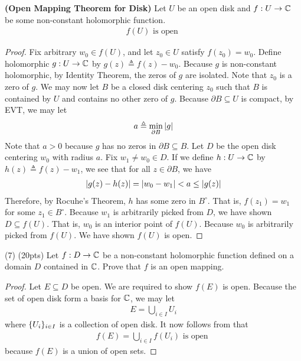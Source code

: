 \documentclass{report}
\begin{document}
\begin{theorem}
\label{OMT}
\textbf{(Open Mapping Theorem for Disk)} Let $U$ be an open disk and  $f:U \rightarrow \mathbb{C}$ be some non-constant holomorphic function. 
\begin{align*}
f(U)\text{ is open }
\end{align*}
\end{theorem}
\begin{proof}
Fix arbitrary $w_0\in f(U)$, and let $z_0\in U$ satisfy $f(z_0)=w_0$. Define holomorphic $g:U\rightarrow \mathbb{C}$ by $g(z)\triangleq f(z)-w_0$. Because $g$ is non-constant holomorphic, by Identity Theorem, the zeros of $g$ are isolated. Note that $z_0$ is a zero of  $g$. We may now let  $B$ be a closed disk centering  $z_0$ such that  $B$ is contained by $U$ and contains no other zero of  $g$. Because $\partial B\subseteq U$ is compact, by EVT, we may let 
\begin{align*}
a\triangleq \min_{\partial B}\left|g\right|
\end{align*}
Note that $a>0$ because  $g$ has no zeros in  $\partial B \subseteq B$. Let $D$ be the open disk centering  $w_0$ with radius  $a$. Fix $w_1 \neq w_0\in D$. If we define $h:U\rightarrow \mathbb{C}$ by $h(z)\triangleq f(z)-w_1$, we see that for all $z\in \partial B$, we have 
\begin{align*}
\left|g(z)-h(z)\right|= \left|w_0-w_1\right|< a \leq \left|g(z)\right|
\end{align*}
Therefore, by Rocuhe's Theorem, $h$ has some zero in  $B^\circ $. That is,  $f(z_1)=w_1$ for some $z_1 \in B^\circ $. Because $w_1$ is arbitrarily picked from  $D$, we have shown  $D \subseteq f(U)$. That is, $w_0$ is an interior point of  $f(U)$. Because $w_0$ is arbitrarily picked from $f(U)$. We have shown $f(U)$ is open. 
\end{proof}
\begin{question}{}{}
  (7) (20pts) Let $f:D\rightarrow \mathbb{C}$ be a non-constant holomorphic function defined on a domain $D$ contained in  $\mathbb{C}$. Prove that  $f$ is an open mapping. 
\end{question}
\begin{proof}
Let $E\subseteq D$ be open. We are required to show $f(E)$ is open. Because the set of open disk form a basis for $\mathbb{C}$, we may let 
\begin{align*}
E= \bigcup_{i \in I}U_i
\end{align*}
where $\{ U_i \}_{i \in I}$ is a collection of open disk. It now follows from  that 
\begin{align*}
f(E)= \bigcup_{i \in I} f(U_i)\text{ is open }
\end{align*}
because $f(E)$ is a union of open sets. 
\end{proof}
\end{document}
